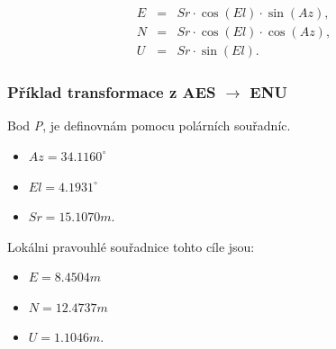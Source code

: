 \begin{eqnarray}
E &=& Sr\cdot \cos{\left(El\right)}\cdot \sin{\left(Az\right)}, \\
N &=& Sr\cdot \cos{\left(El\right)}\cdot \cos{\left(Az\right)}, \\
U &=& Sr\cdot \sin{\left(El\right)} .
\end{eqnarray}

\subsubsection{Příklad transformace z AES $\rightarrow$ ENU}

Bod \textit{P}, je definovnám pomocu polárních souřadníc.
\begin{itemize}
\item $Az = 34.1160^{\circ}$
\item $El = 4.1931^{\circ}$
\item $Sr = 15.1070 m.$
\end{itemize}

Lokálni pravouhlé souřadnice tohto cíle jsou:
\begin{itemize}
\item $E = 8.4504 m$
\item $N = 12.4737 m$
\item $U = 1.1046 m.$
\end{itemize}

